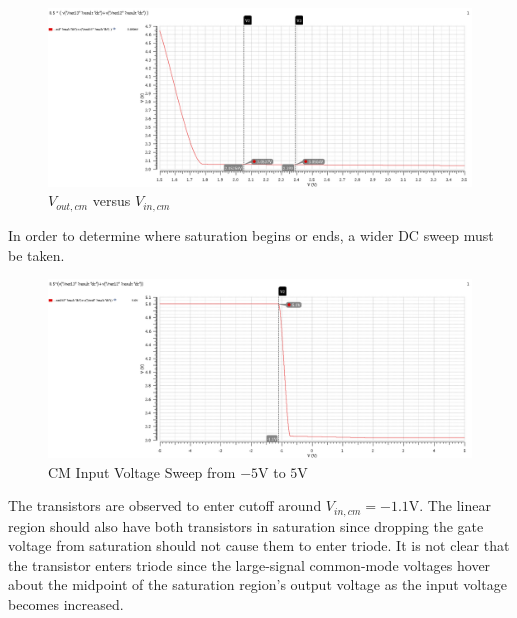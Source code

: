 \FloatBarrier

\begin{figure}[h!]
	\centering
	\includegraphics[scale=0.40]{./images/sim3.PNG}
	\caption{$V_{out,cm}$ versus $V_{in,cm}$}
	\label{fig:sim3}
\end{figure}

\FloatBarrier

In order to determine where saturation begins or ends, a wider DC sweep must be taken.

\FloatBarrier

\begin{figure}[h!]
	\centering
	\includegraphics[scale=0.40]{./images/sim3_bigrange.PNG}
	\caption{CM Input Voltage Sweep from $-5$\si{\volt} to $5$\si{\volt}}
	\label{fig:sim3_bigrange}
\end{figure}

\FloatBarrier

The transistors are observed to enter cutoff around $V_{in,cm}=-1.1$\si{\volt}.
The linear region should also have both transistors in saturation since dropping the gate voltage from saturation should not cause them to enter triode.
It is not clear that the transistor enters triode since the large-signal common-mode voltages hover about the midpoint of the saturation region's output voltage as the input voltage becomes increased. \\

\FloatBarrier

